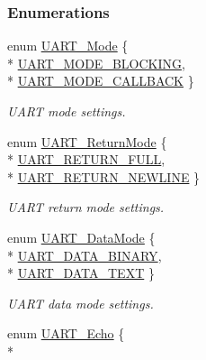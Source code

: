\subsubsection*{Enumerations}
\begin{DoxyCompactItemize}
\item 
enum \hyperlink{_u_a_r_t_8h_a2507a620dba95cd20885c52494d19e90}{U\-A\-R\-T\-\_\-\-Mode} \{ \\*
\hyperlink{_u_a_r_t_8h_a2507a620dba95cd20885c52494d19e90ae6b6bd5d2d5df859ad6724e89e605ebf}{U\-A\-R\-T\-\_\-\-M\-O\-D\-E\-\_\-\-B\-L\-O\-C\-K\-I\-N\-G}, 
\\*
\hyperlink{_u_a_r_t_8h_a2507a620dba95cd20885c52494d19e90ae0dbd9b5195e56c3c2aed10163523754}{U\-A\-R\-T\-\_\-\-M\-O\-D\-E\-\_\-\-C\-A\-L\-L\-B\-A\-C\-K}
 \}
\begin{DoxyCompactList}\small\item\em U\-A\-R\-T mode settings. \end{DoxyCompactList}\item 
enum \hyperlink{_u_a_r_t_8h_acb5a82843435a1b5d51b6c27028d914f}{U\-A\-R\-T\-\_\-\-Return\-Mode} \{ \\*
\hyperlink{_u_a_r_t_8h_acb5a82843435a1b5d51b6c27028d914fa50c07cbaf7518a0acd14137e801687e5}{U\-A\-R\-T\-\_\-\-R\-E\-T\-U\-R\-N\-\_\-\-F\-U\-L\-L}, 
\\*
\hyperlink{_u_a_r_t_8h_acb5a82843435a1b5d51b6c27028d914fa3b8e419e0e12abf80b25f72d17745f76}{U\-A\-R\-T\-\_\-\-R\-E\-T\-U\-R\-N\-\_\-\-N\-E\-W\-L\-I\-N\-E}
 \}
\begin{DoxyCompactList}\small\item\em U\-A\-R\-T return mode settings. \end{DoxyCompactList}\item 
enum \hyperlink{_u_a_r_t_8h_a694090fdb166f94ac30b809f9cba87b8}{U\-A\-R\-T\-\_\-\-Data\-Mode} \{ \\*
\hyperlink{_u_a_r_t_8h_a694090fdb166f94ac30b809f9cba87b8aaa8edcbf6c236b0d86491ea1e7c9e4d8}{U\-A\-R\-T\-\_\-\-D\-A\-T\-A\-\_\-\-B\-I\-N\-A\-R\-Y}, 
\\*
\hyperlink{_u_a_r_t_8h_a694090fdb166f94ac30b809f9cba87b8a87fdfb7ca981eab7f56c51380fd7094e}{U\-A\-R\-T\-\_\-\-D\-A\-T\-A\-\_\-\-T\-E\-X\-T}
 \}
\begin{DoxyCompactList}\small\item\em U\-A\-R\-T data mode settings. \end{DoxyCompactList}\item 
enum \hyperlink{_u_a_r_t_8h_aac6a03c2e1d76f53e1d9d923dcdc24f2}{U\-A\-R\-T\-\_\-\-Echo} \{ \\*

\end{DoxyCompactItemize}
